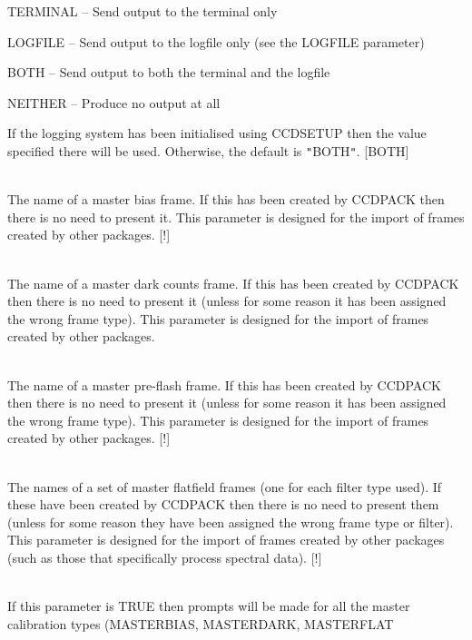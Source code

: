\documentclass[twoside,11pt]{article}
\newcommand{\htmlref}[2]{#1}
\renewcommand{\_}{\texttt{\symbol{95}}}
\newcommand{\qt}[1]{{\tt "}#1{\tt "}}
\newcommand{\xroutine}[1]{\htmlref{{\sc #1}}{#1}}
\newcommand{\sstsubsection}[1]{ \item[{#1}] \mbox{} \\}
\newcommand{\sstitem}{\item}
\newcommand{\sstsubsection}[1]{\item[{#1}]}
\newcommand{\sstitem}{\item}
\begin{document}
{{{{            \sstitem
               TERMINAL  -- Send output to the terminal only

            \sstitem
               LOGFILE   -- Send output to the logfile only (see the
                               LOGFILE parameter)

            \sstitem
               BOTH      -- Send output to both the terminal and the
                               logfile

            \sstitem
               NEITHER   -- Produce no output at all

         }
         If the logging system has been initialised using \xroutine{CCDSETUP}
         then the value specified there will be used. Otherwise, the
         default is \qt{BOTH}.
         [BOTH]
      }

      \sstsubsection{
         MASTERBIAS = LITERAL (Read)
      }{
         The name of a master bias frame. If this has been created by
         CCDPACK then there is no need to present it.  This parameter is
         designed for the import of frames created by other packages.
         [!]
      }
      \sstsubsection{
         MASTERDARK = LITERAL (Read)
      } {
         The name of a master dark counts frame. If this has been
         created by CCDPACK then there is no need to present it (unless
         for some reason it has been assigned the wrong frame type).
         This parameter is designed for the import of frames created
         by other packages.
      }
      \sstsubsection{
         MASTERFLASH = LITERAL (Read)
      } {
         The name of a master pre-flash frame. If this has been
         created by CCDPACK then there is no need to present it (unless
         for some reason it has been assigned the wrong frame type).
         This parameter is designed for the import of frames created
         by other packages.
         [!]
      }
      \sstsubsection{
         MASTERFLAT = LITERAL (Read)
      } {
         The names of a set of master flatfield frames (one for each
         filter type used). If these have been created by CCDPACK then
         there is no need to present them (unless for some reason they
         have been assigned the wrong frame type or filter).  This
         parameter is designed for the import of frames created by other
         packages (such as those that specifically process spectral
         data).
         [!]
      }
      \sstsubsection{
         MASTERS = \_LOGICAL (Read)
      } {
         If this parameter is TRUE then prompts will be made for all the
         master calibration types (MASTERBIAS, MASTERDARK, MASTERFLAT
}}}
\end{document}
